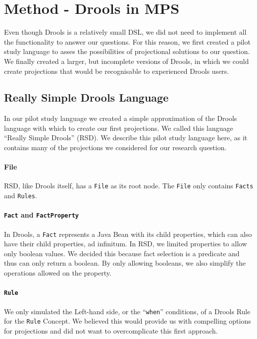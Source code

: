 \section{Method - Drools in MPS}
\label{section:dsr_method}

Even though Drools is a relatively small DSL, we did not need to implement all the functionality to answer our questions.
For this reason, we first created a pilot study language to asses the possibilities of projectional solutions to our question.
We finally created a larger, but incomplete versions of Drools, in which we could create projections that would be recognisable to experienced Drools users.

\subsection{Really Simple Drools Language}
In our pilot study language we created a simple approximation of the Drools language with which to create our first projections.
We called this language ``Really Simple Drools'' (RSD).
We describe this pilot study language here, as it contains many of the projections we considered for our research question.

\paragraph{File} RSD, like Drools itself, has a \texttt{File} as its root node.
The \texttt{File} only contains \texttt{Facts} and \texttt{Rules}.

\paragraph{\texttt{Fact} and \texttt{FactProperty}} In Drools, a \texttt{Fact} represents a Java Bean with its child properties, which can also have their child properties, ad infinitum.
In RSD, we limited properties to allow only boolean values.
We decided this because fact selection is a predicate and thus can only return a boolean.
By only allowing booleans, we also simplify the operations allowed on the property.

\paragraph{\texttt{Rule}} We only simulated the Left-hand side, or the ``\texttt{when}'' conditions, of a Drools Rule for the \texttt{Rule} Concept.
We believed this would provide us with compelling options for projections and did not want to overcomplicate this first approach.

